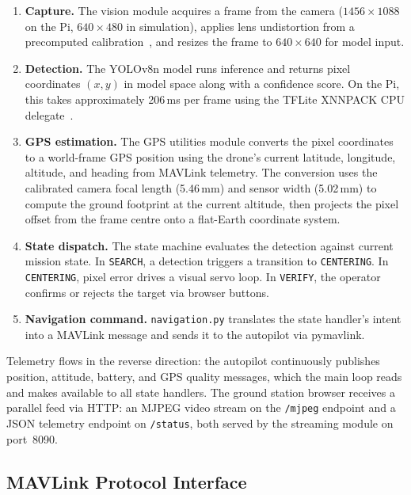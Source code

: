 \begin{enumerate}
    \item \textbf{Capture.} The vision module acquires a frame from the camera ($1456\times1088$ on the Pi, $640\times480$ in simulation), applies lens undistortion from a precomputed calibration~\cite{lens_calibration}, and resizes the frame to $640\times640$ for model input.

    \item \textbf{Detection.} The YOLOv8n model runs inference and returns pixel coordinates $(x, y)$ in model space along with a confidence score. On the Pi, this takes approximately 206\,ms per frame using the TFLite XNNPACK CPU delegate~\cite{david2021tensorflow, tflite}.

    \item \textbf{GPS estimation.} The GPS utilities module converts the pixel coordinates to a world-frame GPS position using the drone's current latitude, longitude, altitude, and heading from MAVLink telemetry. The conversion uses the calibrated camera focal length (5.46\,mm) and sensor width (5.02\,mm) to compute the ground footprint at the current altitude, then projects the pixel offset from the frame centre onto a flat-Earth coordinate system.

    \item \textbf{State dispatch.} The state machine evaluates the detection against current mission state. In \texttt{SEARCH}, a detection triggers a transition to \texttt{CENTERING}. In \texttt{CENTERING}, pixel error drives a visual servo loop. In \texttt{VERIFY}, the operator confirms or rejects the target via browser buttons.

    \item \textbf{Navigation command.} \texttt{navigation.py} translates the state handler's intent into a MAVLink message and sends it to the autopilot via pymavlink.
\end{enumerate}

Telemetry flows in the reverse direction: the autopilot continuously publishes position, attitude, battery, and GPS quality messages, which the main loop reads and makes available to all state handlers. The ground station browser receives a parallel feed via HTTP: an MJPEG video stream on the \texttt{/mjpeg} endpoint and a JSON telemetry endpoint on \texttt{/status}, both served by the streaming module on port~8090.

\subsection{MAVLink Protocol Interface}\label{sec:arch-mavlink}

